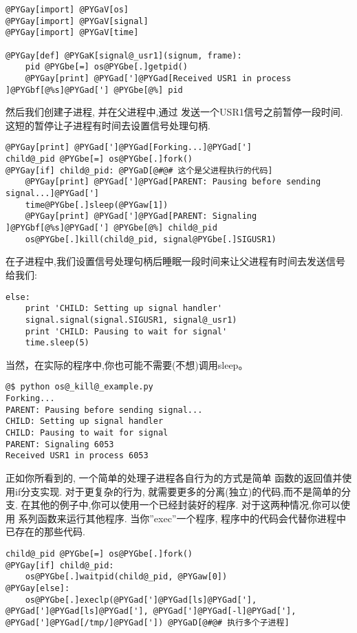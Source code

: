 \documentclass[a4paper,10pt,english]{manual}
\begin{document}
\begin{Verbatim}[commandchars=@\[\]]
@PYGay[import] @PYGaV[os]
@PYGay[import] @PYGaV[signal]
@PYGay[import] @PYGaV[time]

@PYGay[def] @PYGaK[signal@_usr1](signum, frame):
    pid @PYGbe[=] os@PYGbe[.]getpid()
    @PYGay[print] @PYGad[']@PYGad[Received USR1 in process ]@PYGbf[@%s]@PYGad['] @PYGbe[@%] pid
\end{Verbatim}

然后我们创建子进程, 并在父进程中,通过  发送一个USR1信号之前暂停一段时间.这短的暂停让子进程有时间去设置信号处理句柄.

\begin{Verbatim}[commandchars=@\[\]]
@PYGay[print] @PYGad[']@PYGad[Forking...]@PYGad[']
child@_pid @PYGbe[=] os@PYGbe[.]fork()
@PYGay[if] child@_pid: @PYGaD[@#@# 这个是父进程执行的代码]
    @PYGay[print] @PYGad[']@PYGad[PARENT: Pausing before sending signal...]@PYGad[']
    time@PYGbe[.]sleep(@PYGaw[1])
    @PYGay[print] @PYGad[']@PYGad[PARENT: Signaling ]@PYGbf[@%s]@PYGad['] @PYGbe[@%] child@_pid
    os@PYGbe[.]kill(child@_pid, signal@PYGbe[.]SIGUSR1)
\end{Verbatim}

在子进程中,我们设置信号处理句柄后睡眠一段时间来让父进程有时间去发送信号给我们:

\begin{Verbatim}[commandchars=@\[\]]
else:
    print 'CHILD: Setting up signal handler'
    signal.signal(signal.SIGUSR1, signal@_usr1)
    print 'CHILD: Pausing to wait for signal'
    time.sleep(5)
\end{Verbatim}

当然，在实际的程序中,你也可能不需要(不想)调用sleep。

\begin{Verbatim}[commandchars=@\[\]]
@$ python os@_kill@_example.py
Forking...
PARENT: Pausing before sending signal...
CHILD: Setting up signal handler
CHILD: Pausing to wait for signal
PARENT: Signaling 6053
Received USR1 in process 6053
\end{Verbatim}

正如你所看到的, 一个简单的处理子进程各自行为的方式是简单  函数的返回值并使用if分支实现. 对于更复杂的行为, 就需要更多的分离(独立)的代码,而不是简单的分支. 在其他的例子中,你可以使用一个已经封装好的程序. 对于这两种情况,你可以使用  系列函数来运行其他程序. 当你''exec''一个程序, 程序中的代码会代替你进程中已存在的那些代码.

\begin{Verbatim}[commandchars=@\[\]]
child@_pid @PYGbe[=] os@PYGbe[.]fork()
@PYGay[if] child@_pid:
    os@PYGbe[.]waitpid(child@_pid, @PYGaw[0])
@PYGay[else]:
    os@PYGbe[.]execlp(@PYGad[']@PYGad[ls]@PYGad['], @PYGad[']@PYGad[ls]@PYGad['], @PYGad[']@PYGad[-l]@PYGad['], @PYGad[']@PYGad[/tmp/]@PYGad[']) @PYGaD[@#@# 执行多个子进程]
\end{Verbatim}
\end{document}
